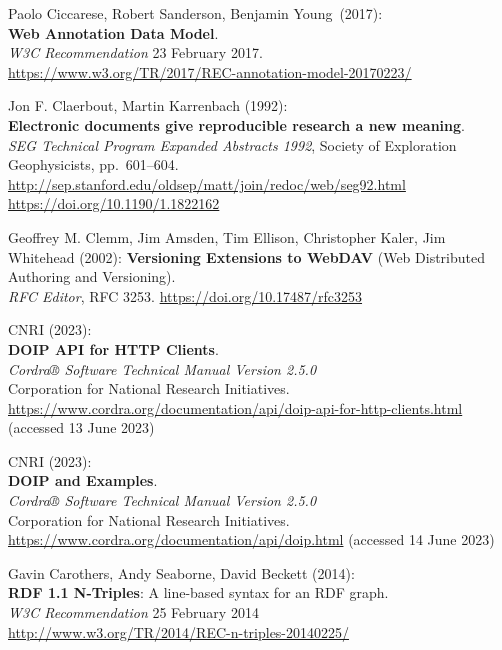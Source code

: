 \begin{thebibliography}{9}
Paolo Ciccarese, Robert Sanderson, Benjamin Young~(2017):\\
\textbf{Web Annotation Data Model}.\\
\emph{W3C Recommendation} 23 February 2017.\\
\url{https://www.w3.org/TR/2017/REC-annotation-model-20170223/}

Jon F. Claerbout, Martin Karrenbach (1992):\\
\textbf{Electronic documents give reproducible research a new
meaning}.\\
\emph{SEG Technical Program Expanded Abstracts 1992}, Society of
Exploration Geophysicists, pp.~601--604.\\
\url{http://sep.stanford.edu/oldsep/matt/join/redoc/web/seg92.html}\\
\url{https://doi.org/10.1190/1.1822162}

Geoffrey M. Clemm, Jim Amsden, Tim Ellison, Christopher Kaler, Jim Whitehead (2002):
\textbf{Versioning Extensions to WebDAV} (Web Distributed Authoring and Versioning).\\
\emph{RFC Editor}, RFC 3253.
\url{https://doi.org/10.17487/rfc3253}

CNRI (2023): \\
\textbf{DOIP API for HTTP Clients}.\\
\emph{Cordra® Software Technical Manual Version 2.5.0}\\
Corporation for National Research Initiatives.\\
\url{https://www.cordra.org/documentation/api/doip-api-for-http-clients.html}
(accessed 13 June 2023)

CNRI (2023): \\
\textbf{DOIP and Examples}.\\
\emph{Cordra® Software Technical Manual Version 2.5.0}\\
Corporation for National Research Initiatives.\\
\url{https://www.cordra.org/documentation/api/doip.html}
(accessed 14 June 2023)

Gavin Carothers, Andy Seaborne, David Beckett (2014):\\
\textbf{RDF 1.1 N-Triples}: A line-based syntax for an RDF graph.\\
\emph{W3C Recommendation} 25 February 2014\\
\url{http://www.w3.org/TR/2014/REC-n-triples-20140225/}


\end{thebibliography}
